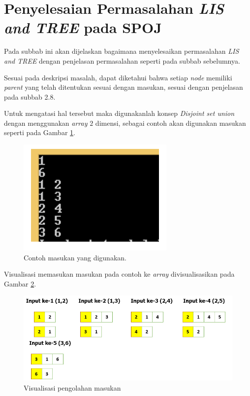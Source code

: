 \section{\quad Penyelesaian Permasalahan \textit{LIS and TREE} pada SPOJ}
\quad Pada subbab ini akan dijelaskan bagaimana menyelesaikan permasalahan \textit{LIS and TREE} dengan penjelasan permasalahan seperti pada subbab sebelumnya.

\quad Sesuai pada deskripsi masalah, dapat diketahui bahwa setiap \textit{node} memiliki \textit{parent} yang telah ditentukan sesuai dengan masukan, sesuai dengan penjelasan pada subbab 2.8.

\quad Untuk mengatasi hal tersebut maka digunakanlah konsep \textit{Disjoint set union} dengan menggunakan \textit{array} $2$ dimensi, sebagai contoh akan digunakan masukan seperti pada Gambar \ref{figure:custominput}.
\begin{figure}[H]
	\centerline{ \includegraphics[scale=0.39]{assets/images/Input_contoh.PNG}}
	\caption{Contoh masukan yang digunakan.}
	\label{figure:custominput}
\end{figure}
\quad Visualisasi memasukan masukan pada contoh ke \textit{array} divisualisasikan pada Gambar \ref{figure:olahinput}.
\begin{figure}[H]
	\centerline{ \includegraphics[scale=0.39]{assets/images/Olah_input.PNG}}
	\caption{Visualisasi pengolahan masukan}
	\label{figure:olahinput}
\end{figure}

